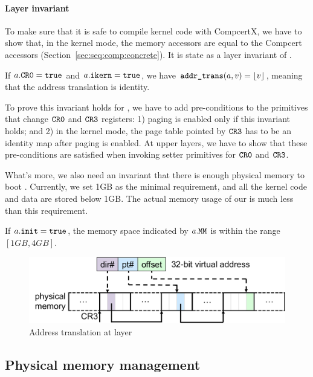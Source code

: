 \paragraph{Layer invariant}
To make sure that it is safe to compile
kernel code with CompcertX,
we have to show that, in the kernel mode,
the memory accessors are equal to the Compcert accessors
(\cf Section~\ref{sec:seq:comp:concrete}).
It is state as a layer invariant of .
\begin{invariant}
If $a.{\texttt{CR0}} = {\texttt{true}}$
and $a.{\texttt{ikern}} = {\texttt{true}}$,
we have ${\texttt{addr\_trans}}(a,v) = \left\lfloor {v} \right\rfloor$,
 meaning that the address translation is identity.
\end{invariant}

To prove this invariant holds for ,
we have to add pre-conditions
to the primitives that change ${\texttt{CR0}}$ and ${\texttt{CR3}}$
registers:
1) paging is enabled only if this invariant
holds;
and 2) in the kernel mode,
the page table pointed by ${\texttt{CR3}}$
has to be an identity map
after paging is enabled.
At upper layers,
we have to show that
these pre-conditions
are satisfied
when invoking setter primitives for ${\texttt{CR0}}$ and ${\texttt{CR3}}$.

What's more,
we also need an invariant that there is enough
physical memory to boot \mCTOS{}.
Currently, we set 1GB as the minimal requirement,
and all the kernel code and data are stored below
1GB. The actual memory usage of our \mCTOS{}
is much less than this requirement.
\begin{invariant}
If $a.{\texttt{init}} = {\texttt{true}}$,
the memory space indicated by $a.{\texttt{MM}}$
is within the range
$[1GB, 4GB]$.
\end{invariant}

\begin{figure}[t]\centering
\includegraphics[scale=.55]{figs/mem_model_1} 
\caption{Address translation at  layer}
\label{fig:seq:mem1}
\hrulefill
\end{figure}




\subsection{Physical memory management}
\label{sec:base:pmm} 

